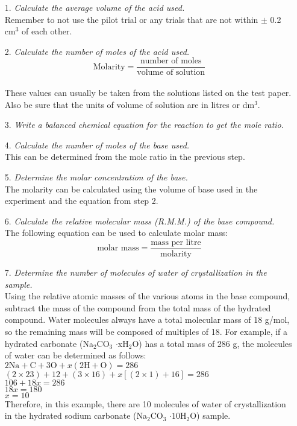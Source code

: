 \begin{enumerate}
\item[1.] \textit{Calculate the average volume of the acid used.}\\
Remember to not use the pilot trial or any trials that are not within $\pm$ 0.2 cm$^3$ of each other.
\item[2.] \textit{Calculate the number of moles of the acid used.}\\
$$\text{Molarity} = \frac{\text{number of moles}}{\text{volume of solution}}$$\\
These values can usually be taken from the solutions listed on the test paper. Also be sure that the units of volume of solution are in litres or dm$^3$.
\item[3.] \textit{Write a balanced chemical equation for the reaction to get the mole ratio.}
\item[4.] \textit{Calculate the number of moles of the base used.}\\
This can be determined from the mole ratio in the previous step.
\item[5.] \textit{Determine the molar concentration of the base.}\\
The molarity can be calculated using the volume of base used in the experiment and the equation from step 2.
\item[6.] \textit{Calculate the relative molecular mass (R.M.M.) of the base compound.}\\
The following equation can be used to calculate molar mass:\\
$$\text{molar mass} = \frac{\text{mass per litre}}{\text{molarity}}$$
\item[7.] \textit{Determine the number of molecules of water of crystallization in the sample.}\\
Using the relative atomic masses of the various atoms in the base compound, subtract the mass of the compound from the total mass of the hydrated compound. Water molecules always have a total molecular mass of 18 g/mol, so the remaining mass will be composed of multiples of 18. For example, if a hydrated carbonate (Na$_2$CO$_3$ $\cdot$xH$_2$O) has a total mass of 286 g, the molecules of water can be determined as follows:\\
$2\text{Na} + \text{C} + 3\text{O} + x(2\text{H} + \text{O}) = 286$\\
$(2 \times 23) + 12 + (3 \times 16) + x[(2 \times 1) + 16] = 286$\\
$106 + 18x = 286$\\
$18x = 180$\\
$x = 10$\\
Therefore, in this example, there are 10 molecules of water of crystallization in the hydrated sodium carbonate (Na$_2$CO$_3$ $\cdot10$H$_2$O) sample.
\end{enumerate}



